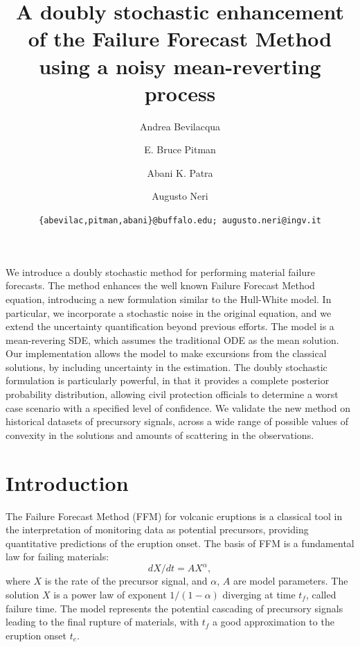 \documentclass{article}
\begin{document}
\title{\bf A doubly stochastic enhancement of the Failure Forecast Method using a noisy mean-reverting process}
\author[1]{Andrea Bevilacqua}
\author[2]{E. Bruce Pitman}
\author[3,4]{Abani K. Patra}
\author[5]{Augusto Neri}


\date{\texttt{\{abevilac,pitman,abani\}@buffalo.edu; augusto.neri@ingv.it}}


\maketitle
\abstract
We introduce a doubly stochastic method for performing material failure forecasts. The method enhances the well known Failure Forecast Method equation, introducing a new formulation similar to the Hull-White model. In particular, we incorporate a stochastic noise in the original equation, and we extend the uncertainty quantification beyond previous efforts. The model is a mean-revering SDE, which assumes the traditional ODE as the mean solution. Our implementation allows the model to make excursions from the classical solutions, by including uncertainty in the estimation. The doubly stochastic formulation is particularly powerful, in that it provides a complete posterior probability distribution, allowing civil protection officials to determine a worst case scenario with a specified level of confidence. We validate the new method on historical datasets of precursory signals, across a wide range of possible values of convexity in the solutions and amounts of scattering in the observations.
\tableofcontents

\section{Introduction}
The Failure Forecast Method (FFM) for volcanic eruptions is a classical tool in the interpretation of monitoring data as potential precursors, providing quantitative predictions of the eruption onset. The basis of FFM is a fundamental law for failing materials:
$$dX/dt=AX^\alpha,$$
where $X$ is the rate of the precursor signal, and $\alpha$, $A$ are model parameters. The solution $X$ is a power law of exponent $1/(1-\alpha)$ diverging at time $t_f$, called failure time. The model represents the potential cascading of precursory signals leading to the final rupture of materials, with $t_f$ a good approximation to the eruption onset $t_e$.
\end{document}
